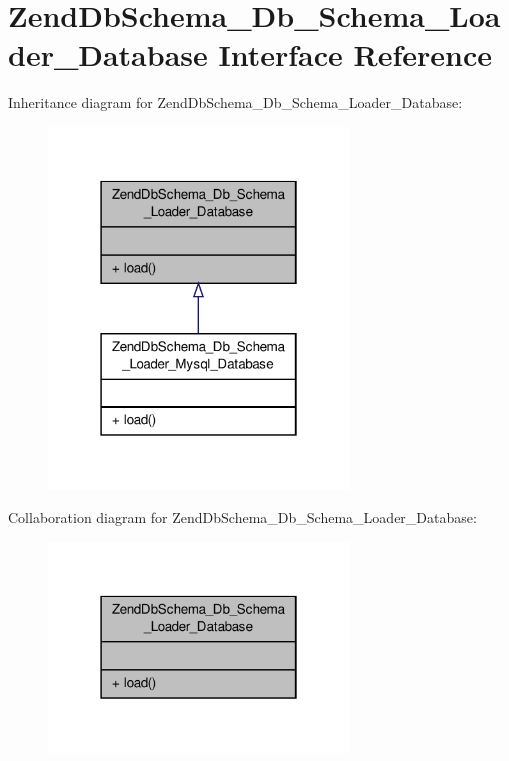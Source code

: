 \hypertarget{interfaceZendDbSchema__Db__Schema__Loader__Database}{\section{Zend\-Db\-Schema\-\_\-\-Db\-\_\-\-Schema\-\_\-\-Loader\-\_\-\-Database Interface Reference}
\label{interfaceZendDbSchema__Db__Schema__Loader__Database}
}


Inheritance diagram for Zend\-Db\-Schema\-\_\-\-Db\-\_\-\-Schema\-\_\-\-Loader\-\_\-\-Database\-:\nopagebreak
\begin{figure}[H]
\begin{center}
\leavevmode
\includegraphics[width=226pt]{interfaceZendDbSchema__Db__Schema__Loader__Database__inherit__graph}
\end{center}
\end{figure}


Collaboration diagram for Zend\-Db\-Schema\-\_\-\-Db\-\_\-\-Schema\-\_\-\-Loader\-\_\-\-Database\-:\nopagebreak
\begin{figure}[H]
\begin{center}
\leavevmode
\includegraphics[width=226pt]{interfaceZendDbSchema__Db__Schema__Loader__Database__coll__graph}
\end{center}
\end{figure}

